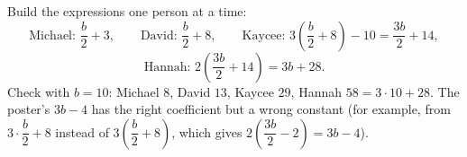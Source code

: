 Build the expressions one person at a time:
\[
\text{Michael: }\dfrac {b}{2}+3,\qquad\text{David: }\dfrac {b}{2}+8,\qquad\text{Kaycee: }3\left(\dfrac {b}{2}+8\right)-10=\dfrac{3b}{2}+14,
\]
\[
\text{Hannah: }2\left(\dfrac{3b}{2}+14\right)=\boxed{3b+28}.
\]
Check with $b=10$: Michael $8$, David $13$, Kaycee $29$, Hannah $58=3\cdot10+28$. The poster's $3b-4$ has the right coefficient but a wrong constant (for example, from $3\cdot\dfrac {b}{2}+8$ instead of $3\left(\dfrac {b}{2}+8\right)$, which gives $2\left(\dfrac{3b}{2}-2\right)=3b-4$).
